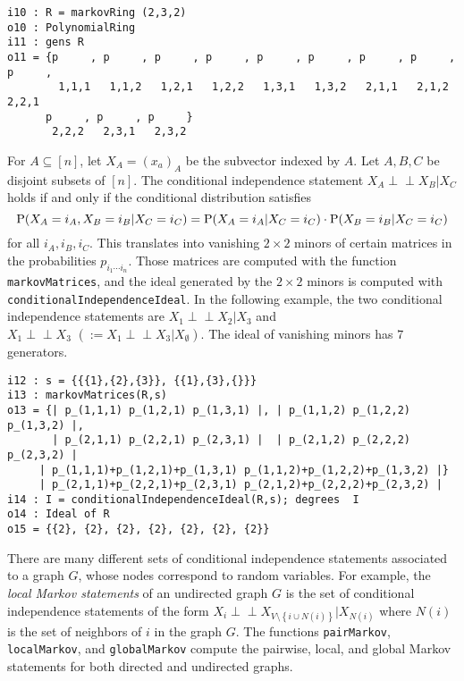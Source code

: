 \documentclass[letterpaper]{article}
\theoremstyle{definition}
\def\ci{\perp\!\!\!\perp}
\begin{document}
\begin{verbatim}
i10 : R = markovRing (2,3,2)
o10 : PolynomialRing
i11 : gens R
o11 = {p     , p     , p     , p     , p     , p     , p     , p     , p     ,
        1,1,1   1,1,2   1,2,1   1,2,2   1,3,1   1,3,2   2,1,1   2,1,2   2,2,1 
      p     , p     , p     }
       2,2,2   2,3,1   2,3,2
\end{verbatim}

For $A \subseteq [n]$, let $X_{A} = (x_{a})_{A}$ be the subvector
indexed by $A$.  Let $A,B,C$ be disjoint subsets of $[n]$.  
The conditional independence statement
$X_{A} \ci X_{B} | X_{C}$ holds if and only if the conditional
distribution satisfies
$$
{\rm P}(X_{A} = i_{A}, X_{B} = i_{B} | X_{C} = i_{C}) =
{\rm P}(X_{A} = i_{A} | X_{C} = i_{C})\cdot {\rm P}( X_{B} = i_{B} | X_{C} = i_{C})$$
for all $i_{A}, i_{B}, i_{C}$.   This translates into vanishing
$2\!\times\! 2$ minors of certain matrices in the probabilities 
$p_{i_{1}\cdots i_{n}}$.  Those matrices are computed with the 
function {\tt markovMatrices},
and the ideal generated by the $2 \!\times\! 2$ minors is computed with 
{\tt conditionalIndependenceIdeal}.  In the following example,
the two conditional independence statements are $X_{1} \ci X_{2} | X_{3}$
and $X_{1} \ci X_{3} \, \,  (:=  X_{1} \ci X_{3} | X_{\emptyset})$. 
The ideal of vanishing minors has $7$ generators. 

\begin{verbatim}
i12 : s = {{{1},{2},{3}}, {{1},{3},{}}}
i13 : markovMatrices(R,s)
o13 = {| p_(1,1,1) p_(1,2,1) p_(1,3,1) |, | p_(1,1,2) p_(1,2,2) p_(1,3,2) |, 
       | p_(2,1,1) p_(2,2,1) p_(2,3,1) |  | p_(2,1,2) p_(2,2,2) p_(2,3,2) |  
     | p_(1,1,1)+p_(1,2,1)+p_(1,3,1) p_(1,1,2)+p_(1,2,2)+p_(1,3,2) |}
     | p_(2,1,1)+p_(2,2,1)+p_(2,3,1) p_(2,1,2)+p_(2,2,2)+p_(2,3,2) |
i14 : I = conditionalIndependenceIdeal(R,s); degrees  I 
o14 : Ideal of R
o15 = {{2}, {2}, {2}, {2}, {2}, {2}, {2}}
\end{verbatim}

There are many different sets of conditional independence statements
associated to a graph $G$, whose nodes correspond to random variables.
For example, the \emph{local Markov statements} of an undirected graph $G$
is the set of conditional independence statements of the form
$X_{i} \ci X_{V \setminus \left\{i \cup N(i)\right\}} | X_{N(i)}$ where $N(i)$ is the set of neighbors of $i$ in the graph $G$.
The functions {\tt pairMarkov}, {\tt localMarkov}, and {\tt globalMarkov}
compute the pairwise, local, and global Markov statements 
for both directed and undirected graphs.
\end{document}

